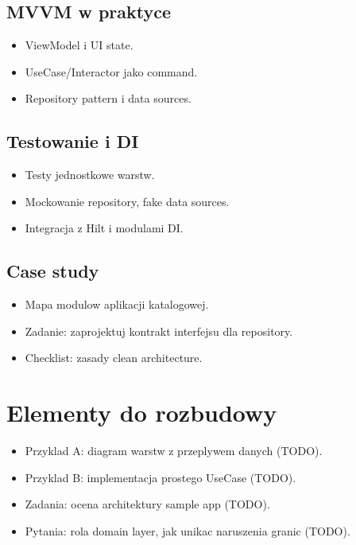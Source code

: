 \subsection{MVVM w praktyce}
\begin{itemize}
  \item ViewModel i UI state.
  \item UseCase/Interactor jako command.
  \item Repository pattern i data sources.
\end{itemize}

\subsection{Testowanie i DI}
\begin{itemize}
  \item Testy jednostkowe warstw.
  \item Mockowanie repository, fake data sources.
  \item Integracja z Hilt i modulami DI.
\end{itemize}

\subsection{Case study}
\begin{itemize}
  \item Mapa modulow aplikacji katalogowej.
  \item Zadanie: zaprojektuj kontrakt interfejsu dla repository.
  \item Checklist: zasady clean architecture.
\end{itemize}

\section{Elementy do rozbudowy}
\begin{itemize}
  \item Przyklad A: diagram warstw z przeplywem danych (TODO).
  \item Przyklad B: implementacja prostego UseCase (TODO).
  \item Zadania: ocena architektury sample app (TODO).
  \item Pytania: rola domain layer, jak unikac naruszenia granic (TODO).
\end{itemize}

